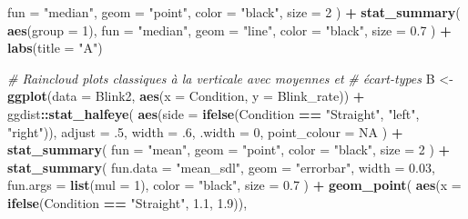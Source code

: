 \documentclass[
  french,
]{book}
\newenvironment{Shaded}{\begin{snugshade}}{\end{snugshade}}
\newcommand{\CommentTok}[1]{\textcolor[rgb]{0.56,0.35,0.01}{\textit{#1}}}
\newcommand{\DataTypeTok}[1]{\textcolor[rgb]{0.13,0.29,0.53}{#1}}
\newcommand{\DecValTok}[1]{\textcolor[rgb]{0.00,0.00,0.81}{#1}}
\newcommand{\FloatTok}[1]{\textcolor[rgb]{0.00,0.00,0.81}{#1}}
\newcommand{\KeywordTok}[1]{\textcolor[rgb]{0.13,0.29,0.53}{\textbf{#1}}}
\newcommand{\NormalTok}[1]{#1}
\newcommand{\OperatorTok}[1]{\textcolor[rgb]{0.81,0.36,0.00}{\textbf{#1}}}
\newcommand{\OtherTok}[1]{\textcolor[rgb]{0.56,0.35,0.01}{#1}}
\newcommand{\StringTok}[1]{\textcolor[rgb]{0.31,0.60,0.02}{#1}}
\begin{document}
\begin{Shaded}
\begin{Highlighting}[]
    \DataTypeTok{fun =} \StringTok{"median"}\NormalTok{,}
    \DataTypeTok{geom =} \StringTok{"point"}\NormalTok{,}
    \DataTypeTok{color =} \StringTok{"black"}\NormalTok{,}
    \DataTypeTok{size =} \DecValTok{2}
\NormalTok{  ) }\OperatorTok{+}
\StringTok{  }\KeywordTok{stat_summary}\NormalTok{(}
    \KeywordTok{aes}\NormalTok{(}\DataTypeTok{group =} \DecValTok{1}\NormalTok{),}
    \DataTypeTok{fun =} \StringTok{"median"}\NormalTok{,}
    \DataTypeTok{geom =} \StringTok{"line"}\NormalTok{,}
    \DataTypeTok{color =} \StringTok{"black"}\NormalTok{,}
    \DataTypeTok{size =} \FloatTok{0.7}
\NormalTok{  ) }\OperatorTok{+}
\StringTok{  }\KeywordTok{labs}\NormalTok{(}\DataTypeTok{title =} \StringTok{"A"}\NormalTok{)}


\CommentTok{# Raincloud plots classiques à la verticale avec moyennes et }
\CommentTok{# écart-types}
\NormalTok{B <-}
\StringTok{  }\KeywordTok{ggplot}\NormalTok{(}\DataTypeTok{data =}\NormalTok{ Blink2, }\KeywordTok{aes}\NormalTok{(}\DataTypeTok{x =}\NormalTok{ Condition, }\DataTypeTok{y =}\NormalTok{ Blink_rate)) }\OperatorTok{+}
\StringTok{  }\NormalTok{ggdist}\OperatorTok{::}\KeywordTok{stat_halfeye}\NormalTok{(}
    \KeywordTok{aes}\NormalTok{(}\DataTypeTok{side =} \KeywordTok{ifelse}\NormalTok{(Condition }\OperatorTok{==}\StringTok{ "Straight"}\NormalTok{, }\StringTok{"left"}\NormalTok{, }\StringTok{"right"}\NormalTok{)),}
    \DataTypeTok{adjust =} \FloatTok{.5}\NormalTok{, }
    \DataTypeTok{width =} \FloatTok{.6}\NormalTok{, }
    \DataTypeTok{.width =} \DecValTok{0}\NormalTok{, }
    \DataTypeTok{point_colour =} \OtherTok{NA}
\NormalTok{    ) }\OperatorTok{+}
\StringTok{  }\KeywordTok{stat_summary}\NormalTok{(}
    \DataTypeTok{fun =} \StringTok{"mean"}\NormalTok{,}
    \DataTypeTok{geom =} \StringTok{"point"}\NormalTok{,}
    \DataTypeTok{color =} \StringTok{"black"}\NormalTok{,}
    \DataTypeTok{size =} \DecValTok{2}
\NormalTok{  ) }\OperatorTok{+}
\StringTok{  }\KeywordTok{stat_summary}\NormalTok{(}
    \DataTypeTok{fun.data  =} \StringTok{"mean_sdl"}\NormalTok{,}
    \DataTypeTok{geom =} \StringTok{"errorbar"}\NormalTok{,}
    \DataTypeTok{width =} \FloatTok{0.03}\NormalTok{,}
    \DataTypeTok{fun.args =} \KeywordTok{list}\NormalTok{(}\DataTypeTok{mul =} \DecValTok{1}\NormalTok{),}
    \DataTypeTok{color =} \StringTok{"black"}\NormalTok{, }
    \DataTypeTok{size =} \FloatTok{0.7}
\NormalTok{  ) }\OperatorTok{+}
\StringTok{  }\KeywordTok{geom_point}\NormalTok{(}
    \KeywordTok{aes}\NormalTok{(}\DataTypeTok{x =} \KeywordTok{ifelse}\NormalTok{(Condition }\OperatorTok{==}\StringTok{ "Straight"}\NormalTok{, }\FloatTok{1.1}\NormalTok{, }\FloatTok{1.9}\NormalTok{)),}

\end{Highlighting}
\end{Shaded}
\end{document}
